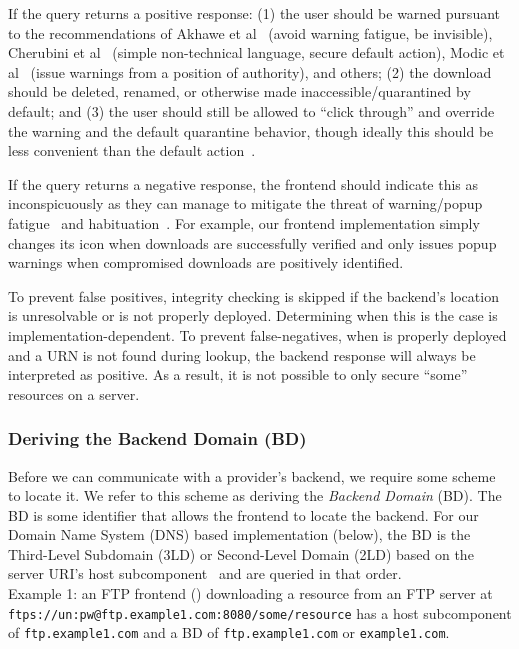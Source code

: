 If the query returns a positive response: (1) the user should be warned pursuant
to the recommendations of Akhawe et al~\cite{Akhawe} (avoid warning fatigue, be
invisible), Cherubini et al~\cite{Cherubini} (simple non-technical language,
secure default action), Modic et al~\cite{Modic} (issue warnings from a position
of authority), and others; (2) the download should be deleted, renamed, or
otherwise made inaccessible/quarantined by default; and (3) the user should
still be allowed to ``click through'' and override the warning and the default
quarantine behavior, though ideally this should be less convenient than the
default action~\cite{Cherubini}.

If the query returns a negative response, the frontend should indicate this as
inconspicuously as they can manage to mitigate the threat of warning/popup
fatigue~\cite{Akhawe, Cherubini} and habituation~\cite{Sunshine}. For example,
our frontend implementation simply changes its icon when downloads are
successfully verified and only issues popup warnings when compromised downloads
are positively identified.

To prevent false positives, integrity checking is skipped if the backend's
location is unresolvable or \SYSTEM{} is not properly deployed. Determining when
this is the case is implementation-dependent. To prevent false-negatives, when
\SYSTEM{} is properly deployed and a URN is not found during lookup, the backend
response will always be interpreted as positive. As a result, it is not possible
to only secure ``some'' resources on a server.

\subsubsection{Deriving the Backend Domain (BD)}

Before we can communicate with a provider's backend, we require some scheme to
locate it. We refer to this scheme as deriving the \emph{Backend Domain} (BD).
The BD is some identifier that allows the frontend to locate the backend. For
our Domain Name System (DNS) based implementation (below), the BD is the
Third-Level Subdomain (3LD) or Second-Level Domain (2LD) based on the server
URI's host subcomponent~\cite{RFC3986} and are queried in that order. \\

Example 1: an FTP frontend () downloading a
resource from an FTP server at
\texttt{ftps://un:pw@ftp.example1.com:8080/some/resource} has a host
subcomponent of \texttt{ftp.example1.com} and a BD of \texttt{ftp.example1.com}
or \texttt{example1.com}. \\

